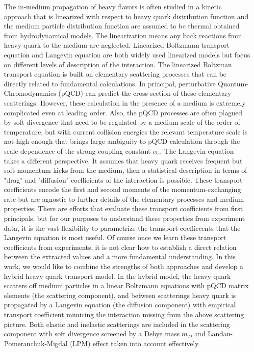 \documentclass[aps, prc, reprint, amsmath, groupedaddress, nofootinbib]{revtex4-1}
\begin{document}
The in-medium propagation of heavy flavors is often studied in a kinetic approach that is linearized with respect to heavy quark distribution function and the medium particle distribution function are assumed to be thermal obtained from hydrodynamical models.
The linearization means any back reactions from heavy quark to the medium are neglected.
Linearized Boltzmann transport equation and Langevin equation are both widely used linearized models but focus on different levels of description of the interaction.
The linearized Boltzman transport equation is built on elementary scattering processes that can be directly related to fundamental calculations.
In principal, perturbative Quantum-Chromodynamics (pQCD) can predict the cross-section of these elementary scatterings.
However, these calculation in the presence of a medium is extremely complicated even at leading order.
Also, the pQCD processes are often plagued by soft divergence that need to be regulated by a medium scale of the order of temperature, but with current collision energies the relevant temperature scale is not high enough that brings large ambiguity to pQCD calculation through the scale dependence of the strong coupling constant $\alpha_s$.
The Langevin equation takes a different perspective. 
It assumes that heavy quark receives frequent but soft momentum kicks from the medium, then a statistical description in terms of "drag" and "diffusion" coefficients of the interaction is possible.
These transport coefficients encode the first and second moments of the momentum-exchanging rate but are agnostic to further details of the elementary processes and medium properties.
There are efforts that evaluate these transport coefficients from first principals, but for our purposes to understand these properties from experiment data, it is the vast flexibility to parametrize the transport coeffiecents that the Langevin equation is most useful.
Of course once we learn these transport coefficients from experiments, it is not clear how to establish a direct relation between the extracted values and a more fundamental understanding.
In this work, we would like to combine the strengths of both approaches
and develop a hybrid heavy quark transport model.
In the hybrid model, the heavy quark scatters off medium particles in a linear Boltzmann equations with pQCD matrix elements (the scattering component), and between scatterings heavy quark is propagated by a Langevin equation (the diffusion component) with empirical transport coefficient mimicing the interaction missing from the above scattering picture.
Both elastic and inelastic scatterings are included in the scattering component with soft divergence screened by a Debye mass $m_D$ and Landau-Pomeranchuk-Migdal (LPM) effect taken into account effectively.
\end{document}
